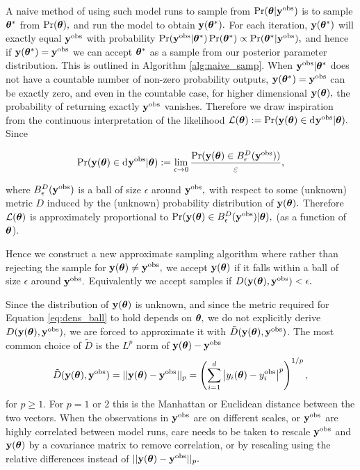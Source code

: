 A naive method of using such model runs to sample from
$\Pr(\bm{\theta}|\mathbf{y}^{\mathrm{obs}})$ is to sample
$\bm{\theta}^\ast$ from $\Pr(\bm{\theta}),$ and run the model to obtain
$\mathbf{y}(\bm{\theta}^\ast).$ For each iteration,
$\mathbf{y}(\bm{\theta}^\ast)$ will exactly equal $\mathbf{y}^{\mathrm{obs}}$
with probability $\Pr(\mathbf{y}^{\mathrm{obs}}|\bm{\theta}^\ast)\Pr(\bm{\theta}^\ast)
    \propto \Pr(\bm{\theta}^\ast|\mathbf{y}^{\mathrm{obs}}),$
and hence if $\mathbf{y}(\bm{\theta}^\ast) = \mathbf{y}^{\mathrm{obs}}$ we can accept $\bm{\theta}^\ast$ 
as a sample
from our posterior parameter distribution. This is outlined in
Algorithm \ref{alg:naive_samp}. When
$\mathbf{y}^{\mathrm{obs}}|\bm{\theta}^\ast$ does not have a countable number of non-zero
probability outputs,
$\mathbf{y}(\bm{\theta}^\ast) = \mathbf{y}^{\mathrm{obs}}$ can be exactly zero, and even in the
countable case, for
higher dimensional $\mathbf{y}(\bm{\theta}),$ the probability of returning exactly
$\mathbf{y}^{\mathrm{obs}}$ vanishes. Therefore we draw inspiration from the continuous
interpretation of the likelihood
$\mathcal{L}(\btheta) := \Pr(\by(\btheta) \in \diff \by^\obs|\btheta).$
Since

\begin{equation}\label{eq:dens_ball}
    \Pr(\by(\btheta) \in \diff \by^\obs|\btheta)
    := \lim_{\epsilon \to 0}
    \frac{\Pr(\by(\btheta) \in B^D_\epsilon(\by^\obs))}{\varepsilon},
\end{equation}

where $B^D_\epsilon(\mathbf{y}^{\mathrm{obs}})$ is a ball of size $\epsilon$ around $\mathbf{y}^{\mathrm{obs}},$
with respect to some (unknown) metric $D$ induced by the (unknown)
probability distribution of $\mathbf{y}(\bm{\theta}).$ Therefore $\mathcal{L}(\bm{\theta})$ is
approximately proportional
to $\Pr(\mathbf{y}(\bm{\theta}) \in B^D_\epsilon(\mathbf{y}^{\mathrm{obs}}) | \bm{\theta}),$
(as a function of $\bm{\theta}$).

Hence we construct a new approximate sampling algorithm where rather than
rejecting the sample for $\mathbf{y}(\bm{\theta}) \neq \mathbf{y}^{\mathrm{obs}},$ we accept
$\mathbf{y}(\bm{\theta})$ if it falls within a ball of size $\epsilon$ around $\mathbf{y}^{\mathrm{obs}}.$
Equivalently we accept samples if $D(\mathbf{y}(\bm{\theta}), \mathbf{y}^{\mathrm{obs}}) < \epsilon.$

Since the distribution of $\mathbf{y}(\bm{\theta})$ is unknown, and since the metric
required for Equation \ref{eq:dens_ball} to hold depends on $\bm{\theta},$ we do
not explicitly derive $D(\mathbf{y}(\bm{\theta}), \mathbf{y}^{\mathrm{obs}}),$ we are forced to
approximate it with $\tilde{D}(\mathbf{y}(\bm{\theta}), \mathbf{y}^{\mathrm{obs}})$. The most common choice
of $\tilde{D}$ is the $L^p$ norm of $\mathbf{y}(\bm{\theta}) - \mathbf{y}^{\mathrm{obs}}$
$$
    \tilde{D}(\mathbf{y}(\bm{\theta}), \mathbf{y}^{\mathrm{obs}})
    =||\mathbf{y}(\bm{\theta}) - \mathbf{y}^{\mathrm{obs}}||_p
    = \left(\sum_{i = 1}^d
    \left|y_i(\bm{\theta})
    - y_i^{\mathrm{obs}}\right|^p\right)^{1/p},
$$
for $p\geq 1.$ For $p=1$ or $2$ this is the Manhattan or Euclidean distance
between the two vectors. When the observations in $\mathbf{y}^{\mathrm{obs}}$ are on different
scales, or $\mathbf{y}^{\mathrm{obs}}$ are highly correlated between model runs, care needs to
be taken to rescale $\mathbf{y}^{\mathrm{obs}}$ and $\mathbf{y}(\bm{\theta})$ by a covariance matrix to
remove correlation, or by rescaling using the relative differences instead of
$||\mathbf{y}(\bm{\theta}) - \mathbf{y}^{\mathrm{obs}}||_p.$


